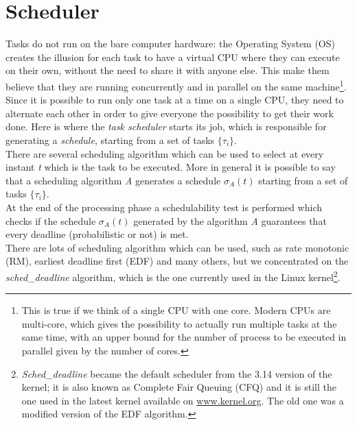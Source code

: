 \section{Scheduler}
Tasks do not run on the bare computer hardware: the Operating System (OS) creates the illusion for each task to have a virtual CPU where they can execute on their own, without the need to share it with anyone else. This make them believe that they are running concurrently and in parallel on the same machine\footnote{This is true if we think of a single CPU with one core. Modern CPUs are multi-core, which gives the possibility to actually run multiple tasks at the same time, with an upper bound for the number of process to be executed in parallel given by the number of cores.}.\\
Since it is possible to run only one task at a time on a single CPU, they need to alternate each other in order to give everyone the possibility to get their work done. Here is where the \emph{task scheduler} starts its job, which is responsible for generating a \emph{schedule}, starting from a set of tasks \( \{\tau_{i}\} \).\\
There are several scheduling algorithm which can be used to select at every instant \emph{t} which is the task to be executed. More in general it is possible to say that a scheduling algorithm \emph{A} generates a schedule \( \sigma_{A}\left(t\right) \) starting from a set of tasks \( \{\tau_{i}\} \).\\
At the end of the processing phase a schedulability test is performed which checks if the schedule \( \sigma_{A}\left(t\right) \) generated by the algorithm \emph{A} guarantees that every deadline (probabilistic or not) is met.\\
There are lots of scheduling algorithm which can be used, such as rate monotonic (RM), earliest deadline first (EDF) and many others, but we concentrated on the \emph{sched\_deadline} algorithm, which is the one currently used in the Linux kernel\footnote{\emph{Sched\_deadline} became the default scheduler from the 3.14 version of the kernel; it is also known as Complete Fair Queuing (CFQ) and it is still the one used in the latest kernel available on \url{www.kernel.org}. The old one was a modified version of the EDF algorithm.}.

